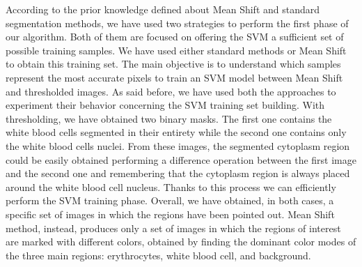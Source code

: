 \documentclass[final,a4paper,12pt,english]{UnicaPhdThesis3}
\begin{document}
{%
According to the prior knowledge defined about Mean Shift and standard segmentation methods, we have used two strategies to perform the first phase of our algorithm. Both of them are focused on offering the SVM a sufficient set of possible training samples. We have used either standard methods or Mean Shift to obtain this training set. The main objective is to understand which samples represent the most accurate pixels to train an SVM model between Mean Shift and thresholded images. As said before, we have used both the approaches to experiment their behavior concerning the SVM training set building. With thresholding, we have obtained two binary masks. The first one contains the white blood cells segmented in their entirety while the second one contains only the white blood cells nuclei.
From these images, the segmented cytoplasm region could be easily obtained performing a difference operation between the first image and the second one and remembering that the cytoplasm region is always placed around the white blood cell nucleus. Thanks to this process we can efficiently perform the SVM training phase. Overall, we have obtained, in both cases, a specific set of images in which the regions have been pointed out. Mean Shift method, instead, produces only a set of images in which the regions of interest are marked with different colors, obtained by finding the dominant color modes of the three main regions: erythrocytes, white blood cell, and background. 

}
\end{document}
